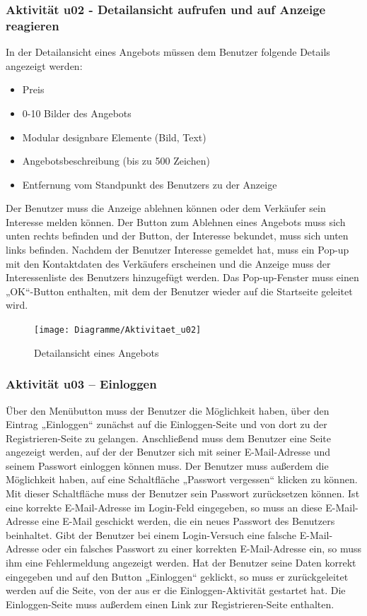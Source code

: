 \documentclass[a4paper,12pt,oneside]{scrartcl}
\begin{document}
\hypertarget{u02}{\subsubsection{Aktivität u02 - Detailansicht aufrufen und auf Anzeige reagieren}}
In der Detailansicht eines Angebots müssen dem Benutzer folgende Details angezeigt werden:
\begin{itemize}
	\item Preis
	\item 0-10 Bilder des Angebots
	\item Modular designbare Elemente (Bild, Text)
	\item Angebotsbeschreibung (bis zu 500 Zeichen)
	\item Entfernung vom Standpunkt des Benutzers zu der Anzeige
\end{itemize}
Der Benutzer muss die Anzeige ablehnen können oder dem Verkäufer sein Interesse melden können.
Der Button zum Ablehnen eines Angebots muss sich unten rechts befinden und der Button, der Interesse bekundet, muss sich unten links befinden.
Nachdem der Benutzer Interesse gemeldet hat, muss ein Pop-up mit den Kontaktdaten des Verkäufers erscheinen und die Anzeige muss der Interessenliste des Benutzers hinzugefügt werden.
Das Pop-up-Fenster muss einen „OK“-Button enthalten, mit dem der Benutzer wieder auf die Startseite geleitet wird.

\begin{figure}[!htbp]
\centering
\noindent\texttt{[image: Diagramme/Aktivitaet\_u02]}
\caption{Detailansicht eines Angebots}
\end{figure}
\FloatBarrier


\subsubsection{Aktivität u03 – Einloggen}
Über den Menübutton muss der Benutzer die Möglichkeit haben, über den Eintrag „Einloggen“ zunächst auf die Einloggen-Seite und von dort zu der Registrieren-Seite zu gelangen.
Anschließend muss dem Benutzer eine Seite angezeigt werden, auf der der Benutzer sich mit seiner E-Mail-Adresse und seinem Passwort einloggen können muss.
Der Benutzer muss außerdem die Möglichkeit haben, auf eine Schaltfläche „Passwort vergessen“ klicken zu können. Mit dieser Schaltfläche muss der Benutzer sein Passwort zurücksetzen können.
Ist eine korrekte E-Mail-Adresse im Login-Feld eingegeben, so muss an diese E-Mail-Adresse eine E-Mail geschickt werden, die ein neues Passwort des Benutzers beinhaltet.
Gibt der Benutzer bei einem Login-Versuch eine falsche E-Mail-Adresse oder ein falsches Passwort zu einer korrekten E-Mail-Adresse ein, so muss ihm eine Fehlermeldung angezeigt werden.
Hat der Benutzer seine Daten korrekt eingegeben und auf den Button „Einloggen“ geklickt, so muss er zurückgeleitet werden auf die Seite, von der aus er die Einloggen-Aktivität gestartet hat.
Die Einloggen-Seite muss außerdem einen Link zur Registrieren-Seite enthalten.
\end{document}
